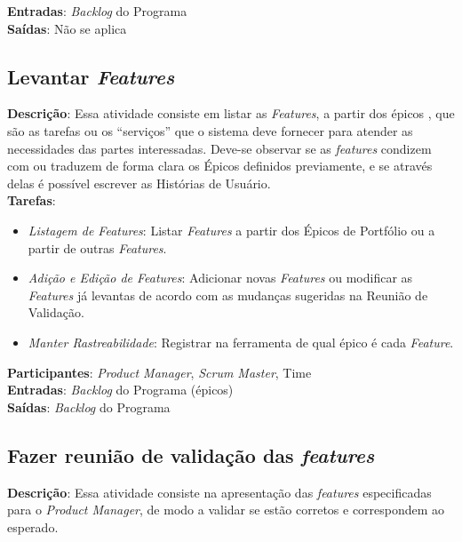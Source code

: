   \textbf{Entradas}: \textit{Backlog} do Programa \\

  \textbf{Saídas}:  Não se aplica\\

\subsection{Levantar \textit{Features}}
\textbf{Descrição}: Essa atividade consiste em listar as \textit{Features}, a partir dos épicos ,
que são as tarefas ou os “serviços” que o sistema deve fornecer para atender as necessidades das partes interessadas.
Deve-se observar se as \textit{features} condizem com ou traduzem de forma clara os Épicos
definidos previamente, e se através delas é possível escrever as Histórias de Usuário.\\

\textbf{Tarefas}:

  \begin{itemize}
   \item \indent \textit{Listagem de \textit{Features}}:  Listar \textit{Features} a partir dos Épicos de Portfólio ou a partir de outras \textit{Features}.

   \item \indent \textit{Adição e Edição de \textit{Features}}: Adicionar novas \textit{Features} ou modificar as \textit{Features} já levantas de acordo com as mudanças sugeridas na Reunião de Validação.

   \item \indent \textit{Manter Rastreabilidade}: Registrar na ferramenta de qual épico é cada \textit{Feature}.
   \end{itemize}

\textbf{Participantes}: \textit{Product Manager}, \textit{Scrum Master}, Time \\

\textbf{Entradas}: \textit{Backlog} do Programa (épicos) \\

\textbf{Saídas}:   \textit{Backlog} do Programa \\

\subsection{Fazer reunião de validação das \textit{features}}
  \textbf{Descrição}: Essa atividade consiste na apresentação das \textit{features} especificadas para o \textit{Product Manager}, de modo a validar se
  estão corretos e correspondem ao esperado.  \\

